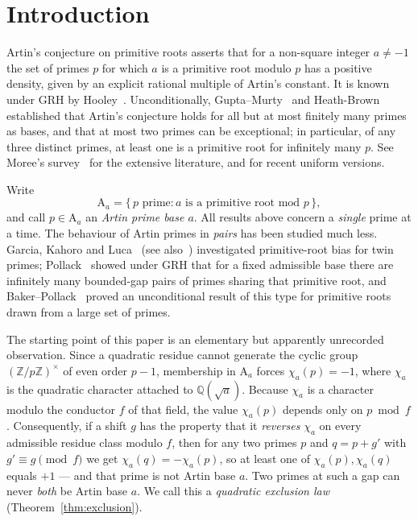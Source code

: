\documentclass[11pt,reqno]{amsart}
\theoremstyle{plain}
\theoremstyle{definition}
\newcommand{\Art}{\mathrm{A}}
\newcommand{\Z}{\mathbb{Z}}
\newcommand{\Q}{\mathbb{Q}}
\begin{document}
\maketitle

\section{Introduction}
\label{sec:intro}

Artin's conjecture on primitive roots asserts that for a non-square integer
$a \neq -1$ the set of primes $p$ for which $a$ is a primitive root modulo $p$
has a positive density, given by an explicit rational multiple of Artin's
constant. It is known under GRH by Hooley~\cite{Hooley1967}. Unconditionally,
Gupta--Murty~\cite{GuptaMurty1984} and Heath-Brown~\cite{HeathBrown1986}
established that Artin's conjecture holds for all but at most finitely many
primes as bases, and that at most two primes can be exceptional; in
particular, of any three distinct primes, at least one is a primitive root for
infinitely many $p$. See Moree's survey~\cite{Moree2012} for the extensive
literature, and \cite{FanPollack2025, PeruccaShparlinski2025} for recent
uniform versions.

Write
\[
  \Art_a = \{\, p \text{ prime} : a \text{ is a primitive root mod } p \,\},
\]
and call $p \in \Art_a$ an \emph{Artin prime base $a$}. All results above
concern a \emph{single} prime at a time. The behaviour of Artin primes in
\emph{pairs} has been studied much less. Garcia, Kahoro and
Luca~\cite{GarciaKahoroLuca2019} (see also~\cite{GarciaLucaShiUdell2020})
investigated primitive-root bias for twin primes; Pollack~\cite{Pollack2014}
showed under GRH that for a fixed admissible base there are infinitely many
bounded-gap pairs of primes sharing that primitive root, and
Baker--Pollack~\cite{BakerPollack2016} proved an unconditional result of this
type for primitive roots drawn from a large set of primes.

The starting point of this paper is an elementary but apparently unrecorded
observation. Since a quadratic residue cannot generate the cyclic group
$(\Z/p\Z)^\times$ of even order $p - 1$, membership in $\Art_a$ forces
$\chi_a(p) = -1$, where $\chi_a$ is the quadratic character attached to
$\Q(\sqrt{a})$. Because $\chi_a$ is a character modulo the conductor $f$ of
that field, the value $\chi_a(p)$ depends only on $p \bmod f$. Consequently, if
a shift $g$ has the property that it \emph{reverses} $\chi_a$ on every
admissible residue class modulo $f$, then for any two primes $p$ and $q = p+g'$
with $g' \equiv g \pmod f$ we get $\chi_a(q) = -\chi_a(p)$, so at least one of
$\chi_a(p), \chi_a(q)$ equals $+1$ --- and that prime is not Artin base $a$.
Two primes at such a gap can never \emph{both} be Artin base $a$. We call this
a \emph{quadratic exclusion law} (Theorem~\ref{thm:exclusion}).
\end{document}
